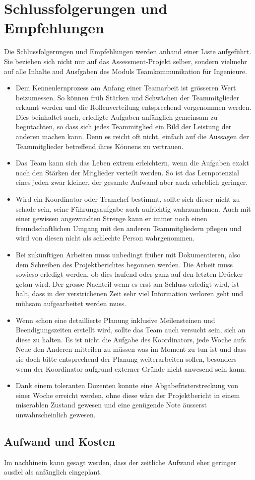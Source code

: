 \chapter{Schlussfolgerungen und Empfehlungen}
Die Schlussfolgerungen und Empfehlungen werden anhand einer Liste aufgeführt. Sie beziehen sich nicht nur auf das Assessment-Projekt selber, sondern vielmehr auf alle Inhalte aud Ausfgaben des Moduls Teamkommunikation für Ingenieure. 

\begin{itemize}
\item Dem Kennenlernprozess am Anfang einer Teamarbeit ist grösseren Wert beizumessen. So können früh Stärken und Schwächen der Teammitglieder erkannt werden und die Rollenverteilung entsprechend vorgenommen werden. Dies beinhaltet auch, erledigte Aufgaben anfänglich gemeinsam zu begutachten, so dass sich jedes Teammitglied ein Bild der Leistung der anderen machen kann. Denn es reicht oft nicht, einfach auf die Aussagen der Teammitglieder betreffend ihres Könnens zu vertrauen.
\item Das Team kann sich das Leben extrem erleichtern, wenn die Aufgaben exakt nach den Stärken der Mitglieder verteilt werden. So ist das Lernpotenzial eines jeden zwar kleiner, der gesamte Aufwand aber auch erheblich geringer.
\item Wird ein Koordinator oder Teamchef bestimmt, sollte sich dieser nicht zu schade sein, seine Führungsaufgabe auch aufrichtig wahrzunehmen. Auch mit einer gewissen angewandten Strenge kann er immer noch einen freundschaftlichen Umgang mit den anderen Teammitgliedern pflegen und wird von diesen nicht als schlechte Person wahrgenommen.
\item Bei zukünftigen Arbeiten muss unbedingt früher mit Dokumentieren, also dem Schreiben des Projektberichtes begonnen werden. Die Arbeit muss sowieso erledigt werden, ob dies laufend oder ganz auf den letzten Drücker getan wird. Der grosse Nachteil wenn es erst am Schluss erledigt wird, ist halt, dass in der verstrichenen Zeit sehr viel Information verloren geht und mühsam aufgearbeitet werden muss.
\item Wenn schon eine detaillierte Planung inklusive Meilensteinen und Beendigungszeiten erstellt wird, sollte das Team auch versucht sein, sich an diese zu halten. Es ist nicht die Aufgabe des Koordinators, jede Woche aufs Neue den Anderen mitteilen zu müssen was im Moment zu tun ist und dass sie doch bitte entsprechend der Planung weiterarbeiten sollen, besonders wenn der Koordinator aufgrund externer Gründe nicht anwesend sein kann.
\item Dank einem toleranten Dozenten konnte eine Abgabefristerstreckung von einer Woche erreicht werden, ohne diese wäre der Projektbericht in einem miserablen Zustand gewesen und eine genügende Note äusserst unwahrscheinlich gewesen.
\end{itemize}

\section{Aufwand und Kosten}
Im nachhinein kann gesagt werden, dass der zeitliche Aufwand eher geringer ausfiel als anfänglich eingeplant.

